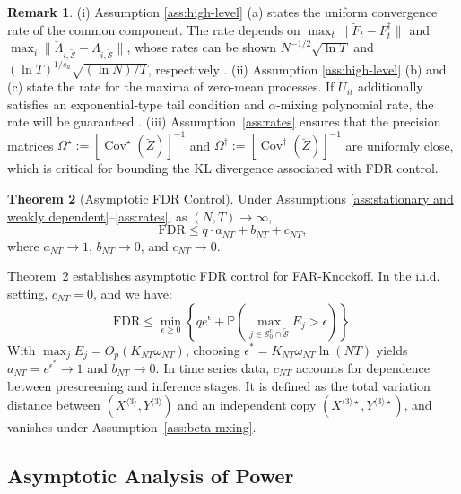 ﻿\documentclass[12pt]{article}
\newcommand{\0}{\mbox{\bf 0}}
\theoremstyle{plain}%
\newtheorem{remark}{Remark}
\newtheorem{theorem}{Theorem}[section]
\theoremstyle{definition}
\newtheorem{theorem}{Theorem}[section]
\newtheorem{remark}[theorem]{Remark}
\begin{document}
{\begin{remark} (i) Assumption \ref{ass:high-level} (a) states the uniform convergence rate of the common component. The rate depends on $\max_{t} \| \breve{F}_{t} - F^{\dagger}_{t} \| $ and $\max_{i} \| \breve{\Lambda}_{i, \widetilde{\mathcal{S}}} - \Lambda_{i, \widetilde{\mathcal{S}}} \|$, whose rates can be shown $N^{-1/2} \sqrt{\ln T}$ and $(\ln T)^{1/s_a} \sqrt{(\ln N)/T}$, respectively \cite[Theorem 3.5]{WeiZhang2024}. (ii) Assumption \ref{ass:high-level} (b) and (c) state the rate for the maxima of zero-mean processes. If $U_{it}$ additionally satisfies an exponential-type tail condition and $\alpha$-mixing polynomial rate, the rate will be guaranteed   \cite[Lemma A.3]{FanLiaoMincheva2011}. (iii) Assumption~\ref{ass:rates} ensures that the precision matrices $\Omega^{\star}:=\left[\operatorname{Cov}^{\star}(\breve{Z})\right]^{-1}$ and $\Omega^{\dagger}:=\left[\operatorname{Cov}^{\dagger}(\breve{Z})\right]^{-1}$ are uniformly close, which is critical for bounding the KL divergence associated with FDR control.   
\end{remark}

\begin{theorem}[Asymptotic FDR Control]
\label{thm:FDR_Control}
Under Assumptions \ref{ass:stationary and weakly dependent}--\ref{ass:rates}, as $(N, T) \to \infty$,
\begin{equation*}
\mathrm{FDR} \leq q \cdot a_{NT} + b_{NT} + c_{NT},
\end{equation*}
where $a_{NT} \to 1$, $b_{NT} \to 0$, and $c_{NT} \to 0$.
\end{theorem}

Theorem~\ref{thm:FDR_Control} establishes asymptotic FDR control for FAR-Knockoff. In the i.i.d. setting, $c_{NT} = 0$, and we have:
\[
\mathrm{FDR} \leq \min_{\epsilon \geq 0} \left\{ q e^{\epsilon} + \mathbb{P} \left( \max_{j \in \mathcal{S}_0^c \cap \widetilde{\mathcal{S}}} E_j > \epsilon \right) \right\}.
\]
With $\max_j E_j = O_p(K_{NT} \omega_{NT})$, choosing $\epsilon^{\ast} = K_{NT} \omega_{NT} \ln(NT)$ yields $a_{NT} = e^{\epsilon^{\ast}} \to 1$ and $b_{NT} \to 0$. In time series data, $c_{NT}$ accounts for dependence between prescreening and inference stages. It is defined as the total variation distance between $(X^{\langle 3 \rangle}, Y^{\langle 3 \rangle})$ and an independent copy $(X^{\langle 3 \rangle \star}, Y^{\langle 3 \rangle \star})$, and vanishes under Assumption~\ref{ass:beta-mxing}.



\subsection{Asymptotic Analysis of Power}

}
\end{document}
